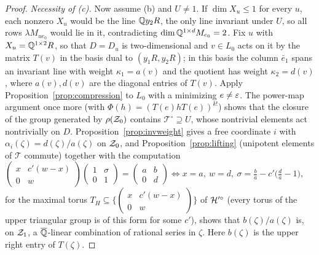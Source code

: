 \begin{proof}
\emph{Necessity of (c).} Now assume (b) and $U\ne1$. If $\dim X_u\le1$ for every $u$, each nonzero $X_u$ would be the line $\mathbb{Q} y_2R$, the only line invariant under $U$, so all rows $\lambda M_{ue_0}$ would lie in it, contradicting $\dim\mathbb{Q}^{1\times d}M_{e_0}=2$. Fix $u$ with $X_u=\mathbb{Q}^{1\times2}R$, so that $D=D_u$ is two-dimensional and $v\in L_0$ acts on it by the matrix $T(v)$ in the basis dual to $(y_1R,y_2R)$; in this basis the column $\bar e_1$ spans an invariant line with weight $\kappa_1=a(v)$ and the quotient has weight $\kappa_2=d(v)$, where $a(v),d(v)$ are the diagonal entries of $T(v)$. Apply Proposition~\ref{prop:compression} to $L_0$ with a minimizing $e\ne\varepsilon$. The power-map argument once more (with $\Phi(h)=(T(e)hT(e))^{k!}$) shows that the closure of the group generated by $\rho(\mathcal{Z}_0)$ contains $\mathcal T^\circ\supseteq U$, whose nontrivial elements act nontrivially on $D$. Proposition~\ref{prop:invweight} gives a free coordinate $i$ with $\alpha_i(\zeta)=d(\zeta)/a(\zeta)$ on $\mathcal{Z}_0$, and Proposition~\ref{prop:lifting} (unipotent elements of $\mathcal T$ commute) together with the computation $\left(\begin{smallmatrix}x&c'(w-x)\\0&w\end{smallmatrix}\right)\left(\begin{smallmatrix}1&\sigma\\0&1\end{smallmatrix}\right)=\left(\begin{smallmatrix}a&b\\0&d\end{smallmatrix}\right)\iff x=a,\ w=d,\ \sigma=\frac ba-c'\bigl(\frac da-1\bigr)$, for the maximal torus $T_H\subseteq\{(\begin{smallmatrix}x&c'(w-x)\\0&w\end{smallmatrix})\}$ of $\mathcal{H}'^\circ$ (every torus of the upper triangular group is of this form for some $c'$), shows that $b(\zeta)/a(\zeta)$ is, on $\mathcal{Z}_1$, a $\overline{\mathbb{Q}}$-linear combination of rational series in $\zeta$. Here $b(\zeta)$ is the upper right entry of $T(\zeta)$.


\end{proof}
